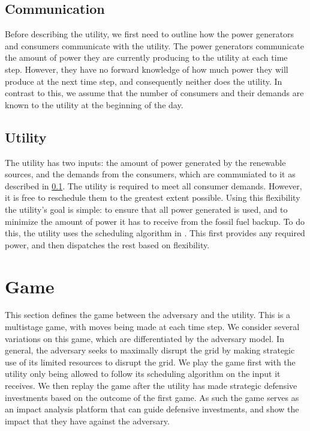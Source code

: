 \documentclass[conference]{IEEEtran}
\begin{document}
\subsection{Communication}
\label{Communication}

Before describing the utility, we first need to outline how the power generators and consumers communicate with the utility.  The power generators communicate the amount of power they are currently producing to the utility at each time step.  However, they have no forward knowledge of how much power they will produce at the next time step, and consequently neither does the utility.  In contrast to this, we assume that the number of consumers and their demands are known to the utility at the beginning of the day.

\subsection{Utility}
\label{Utility}

The utility has two inputs: the amount of power generated by the renewable sources, and the demands from the consumers, which are communiated to it as described in \ref{Communication}.  The utility is required to meet all consumer demands.  However, it is free to reschedule them to the greatest extent possible.  Using this flexibility the utility's goal is simple: to ensure that all power generated is used, and to minimize the amount of power it has to receive from the fossil fuel backup. To do this, the utility uses the scheduling algorithm in \cite{petersen2013taxonomy}.  This first provides any required power, and then dispatches the rest based on flexibility.

\section{Game}
\label{Game}

This section defines the game between the adversary and the utility.  This is a multistage game, with moves being made at each time step.  We consider several variations on this game, which are differentiated by the adversary model.  In general, the adversary seeks to maximally disrupt the grid by making strategic use of its limited resources to disrupt the grid.  We play the game first with the utility only being allowed to follow its scheduling algorithm on the input it receives.  We then replay the game after the utility has made strategic defensive investments based on the outcome of the first game.  As such the game serves as an impact analysis platform that can guide defensive investments, and show the impact that they have against the adversary.   
\end{document}

